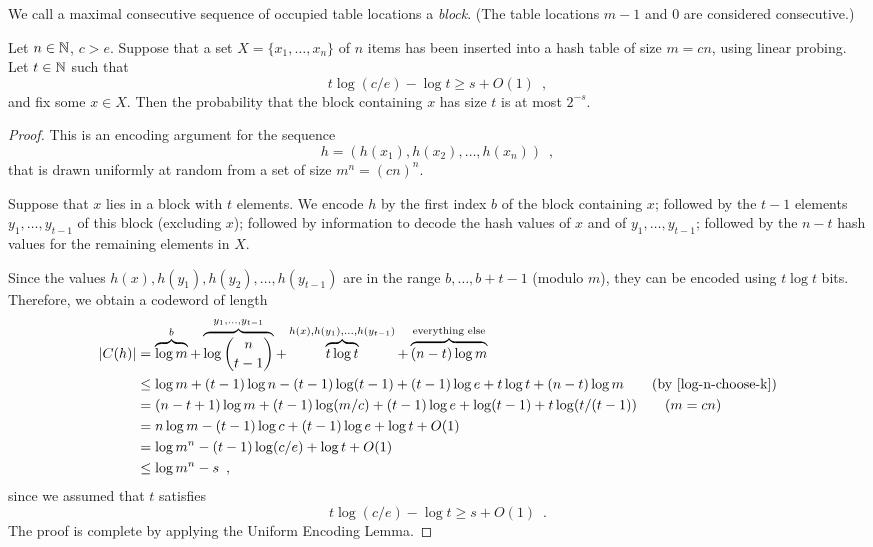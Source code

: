 \documentclass[prodmode,acmcsur]{acmsmall}
\begin{document}
We call a maximal consecutive sequence of occupied table locations a
\emph{block}. (The table locations $m-1$ and $0$ are considered
consecutive.)

\begin{thm}
  Let $n \in \mathbb{N}$, $c > e$.
  Suppose that a set $X = \{x_1, \dots, x_n\}$ of $n$ items 
  has been inserted into a hash table of size $m = cn$, using linear 
  probing.
  Let $t \in \mathbb{N}$ such that
  \[
    t \log (c/e) - \log t \ge s + O(1) \enspace ,
  \]
  and fix some $x\in X$. 
  Then the probability that the block containing
  $x$ has size $t$
  is at most $2^{-s}$.
\end{thm}

\begin{proof}
  This is an encoding argument for 
  the sequence
  \[
    h = (h(x_1),h(x_2),\ldots,h(x_n)) \enspace ,
  \]
  that is drawn uniformly at random from a set of size
  $m^n = (cn)^n$.
  
  Suppose that $x$ lies in a block with $t$ elements.
  We encode $h$ by the first index $b$ of the block containing $x$;
  followed by the $t-1$ elements $y_1,\dots,y_{t-1}$ of this block
  (excluding $x$); followed by information to decode the hash
  values of $x$ and of $y_1,\dots,y_{t-1}$; followed by
  the $n-t$ hash values for the remaining elements in $X$.

  Since the values $h(x),h(y_1),h(y_2),\ldots,h(y_{t-1})$ are in the range
  $b,\ldots,b+t-1$ (modulo $m$), they can be encoded using
  $t\log t$ bits.  Therefore, 
  we obtain a codeword of length 
  \begin{align*}
    |C(h)| & = \overbrace{\log m}^{b} + \overbrace{\log\binom{n}{t-1}}^{y_1,\ldots,y_{t-1}} + \overbrace{t\log t}^{h(x),h(y_1),\ldots,h(y_{t-1})} + \overbrace{(n-t)\log m}^{\text{everything else}} \\
           & \le \log m + (t-1)\log n - 
             (t-1)\log(t-1) + (t-1)\log e + t\log t + (n-t)\log m \tag{by \eqref{log-n-choose-k}}\\
	  &=
         (n-t+1)\log m + (t-1)\log (m/c) + (t-1)\log e + \log (t-1)+ t\log(t/(t-1)) \tag{$m = cn$}\\
           & = n\log m - (t-1)\log c + (t-1)\log e + \log t + O(1) \\
           & = \log m^n - (t-1)\log(c/e) + \log t + O(1) \\
           & \le \log m^n - s \enspace ,
  \end{align*}
  since we assumed that $t$ satisfies
  \[
    t \log (c/e) - \log t \ge s + O(1) \enspace .
  \]
  The proof is complete by applying the Uniform Encoding Lemma.
\end{proof}
\end{document}
